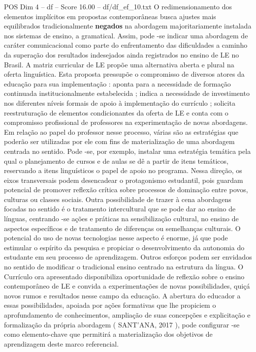 \begin{textsample}{POS Dim 4 – df – Score 16.00 – df/df\_ef\_10.txt}
O redimensionamento dos elementos implícitos em propostas contemporâneas busca ajustes mais equilibrados tradicionalmente \textbf{negados} na abordagem majoritariamente instalada nos sistemas de ensino, a gramatical.
Assim, pode -se indicar uma abordagem de caráter comunicacional como parte do enfrentamento das dificuldades a caminho da superação dos resultados indesejados ainda registrados no ensino de LE no Brasil.
A matriz curricular de LE propõe uma alternativa aberta e plural na oferta linguística.
Esta proposta pressupõe o compromisso de diversos atores da educação para sua implementação : aponta para a necessidade de formação continuada institucionalmente estabelecida ; indica a necessidade de investimento nos diferentes níveis formais de apoio à implementação do currículo ; solicita reestruturação de elementos condicionantes da oferta de LE e conta com o compromisso profissional de professores na experimentação de novas abordagens.
Em relação ao papel do professor nesse processo, várias são as estratégias que poderão ser utilizadas por ele com fins de materialização de uma abordagem centrada no sentido.
Pode -se, por exemplo, instalar uma estratégia temática pela qual o planejamento de cursos e de aulas se dê a partir de itens temáticos, reservando a itens linguísticos o papel de apoio no programa.
Nessa direção, os eixos transversais podem desencadear o protagonismo estudantil, pois guardam potencial de promover reflexão crítica sobre processos de dominação entre povos, culturas ou classes sociais.
Outra possibilidade de trazer à cena abordagens focadas no sentido é o tratamento intercultural que se pode dar ao ensino de línguas, centrando -se ações e práticas na sensibilização cultural, no ensino de aspectos específicos e de tratamento de diferenças ou semelhanças culturais.
O potencial do uso de novas tecnologias nesse aspecto é enorme, já que pode estimular o espírito da pesquisa e propiciar o desenvolvimento da autonomia do estudante em seu processo de aprendizagem.
Outros esforços podem ser envidados no sentido de modificar o tradicional ensino centrado na estrutura da língua.
O Currículo ora apresentado disponibiliza oportunidade de reflexão sobre o ensino contemporâneo de LE e convida a experimentações de novas possibilidades, quiçá novos rumos e resultados nesse campo da educação.
A abertura do educador a essas possibilidades, apoiada por ações formativas que lhe propiciem o aprofundamento de conhecimentos, ampliação de suas concepções e explicitação e formalização da própria abordagem ( SANT’ANA, 2017 ), pode configurar -se como elemento-chave que permitirá a materialização dos objetivos de aprendizagem deste marco referencial.

\end{textsample}
